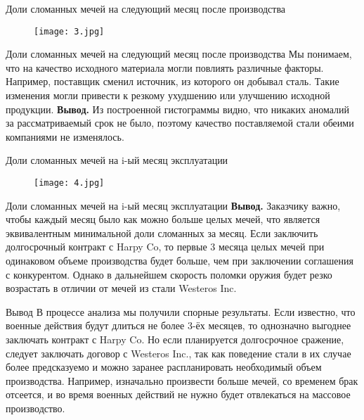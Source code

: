 \documentclass{beamer}
\begin{document}
\begin{frame}{Доли сломанных мечей на следующий месяц после производства}
\begin{figure}
\centering
\texttt{[image: 3.jpg]}
\end{figure}
\end{frame}

\begin{frame}{Доли сломанных мечей на следующий месяц после производства}
Мы понимаем, что на качество исходного материала могли повлиять различные факторы. Например, поставщик сменил источник, из которого он добывал сталь. Такие изменения могли привести к резкому ухудшению или улучшению исходной продукции. 
\newline\textbf{Вывод.} Из построенной гистограммы видно, что никаких аномалий за рассматриваемый срок не было, поэтому качество поставляемой стали обеими компаниями не изменялось.
\end{frame}

\begin{frame}{Доли сломанных мечей на i-ый месяц эксплуатации}
\begin{figure}
\centering
\texttt{[image: 4.jpg]}
\end{figure}
\end{frame}

\begin{frame}{Доли сломанных мечей на i-ый месяц эксплуатации}
\textbf{Вывод.} Заказчику важно, чтобы каждый месяц было как можно больше целых мечей, что является эквивалентным минимальной доли сломанных за месяц. Если заключить долгосрочный контракт с Harpy Co, то первые 3 месяца целых мечей при одинаковом объеме производства будет больше, чем при заключении соглашения с конкурентом. Однако в дальнейшем скорость поломки оружия будет резко возрастать в отличии от мечей из стали Westeros Inc.  
\end{frame}

\begin{frame}{Вывод}
В процессе анализа мы получили спорные результаты. Если известно, что военные действия будут длиться не более 3-ёх месяцев, то однозначно выгоднее заключать контракт с Harpy Co. Но если планируется долгосрочное сражение, следует заключать договор с Westeros Inc., так как поведение стали в их случае более предсказуемо и можно заранее распланировать необходимый объем производства.  Например, изначально произвести больше мечей, со временем брак отсеется, и во время военных действий не нужно будет отвлекаться на массовое производство. 
\end{frame}
\end{document}
